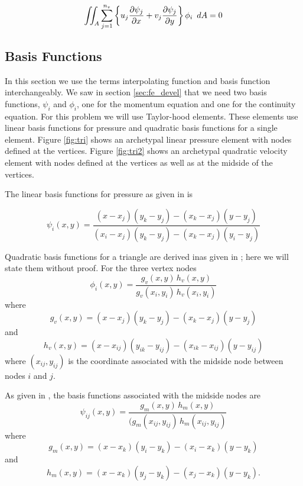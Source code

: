 \documentclass[wrr]{agutex}  %
\newcommand{\p}{\partial}
\begin{document}
\begin{article}
\begin{equation}
\iint_A\sum_{j=1}^{n_v}\left\{u_j\frac{\p \psi_j}{\p x}+v_j{\p \psi_j \over \p y}\right\}\phi_i\,\,\,dA = 0 \label{eqn:full3333}
\end{equation}

\subsection{Basis Functions}

In this section we use the terms interpolating function and basis function interchangeably. We saw in section \ref{sec:fe_devel} that we need two basis functions, $\psi_i$ and $\phi_i$, one for the momentum equation and one for the continuity equation.  For this problem we will use Taylor-hood elements.  These elements use linear basis functions for pressure and quadratic basis functions for a single element. Figure \ref{fig:tri} shows an archetypal linear pressure element with nodes defined at the vertices. Figure \ref{fig:tri2} shows an archetypal quadratic velocity element with nodes defined at the vertices as well as at the midside of the vertices.

The linear basis functions for pressure as given in \cite{Lapidus1982} is 

\begin{equation}
  \psi_i(x,y) = \frac{ ( x   - x_j )  ( y_k - y_j ) - ( x_k - x_j )  ( y   - y_j ) }
                     { ( x_i - x_j )  ( y_k - y_j ) - ( x_k - x_j )  ( y_i - y_j ) }
\end{equation}

Quadratic basis functions for a triangle are derived inas given in \cite{Burkardt2005b}; here we will state them without proof. For the three vertex nodes
\begin{equation}
  \phi_i(x,y) = \frac{ g_v(x,y) \, h_v(x,y) } {  g_v(x_i,y_i) \, h_v(x_i,y_i)  }
\end{equation}
where 
\begin{equation}
  g_v(x,y) = ( x - x_j ) ( y_k - y_j ) - ( x_k - x_j ) ( y - y_j )
\end{equation}
and
\begin{equation}
  h_v(x,y) = ( x - x_{ij} ) ( y_{ik} - y_{ij} ) - ( x_{ik} - x_{ij} ) ( y - y_{ij} )
\end{equation}
where $(x_{ij},y_{ij})$ is the coordinate associated with the midside node between nodes $i$ and $j$.

As given in \cite{Burkardt2005b}, the basis functions associated with the midside nodes are
\begin{equation}
  \psi_{ij}(x,y) = \frac{ g_m(x,y) \, h_m(x,y) }{ ( g_m(x_{ij} ,y_{ij} ) \, h_m(x_{ij} ,y_{ij} ) }
\end{equation}
where
\begin{equation}
  g_m(x,y) = ( x - x_k ) ( y_i - y_k ) - ( x_i - x_k ) ( y - y_k )
\end{equation}
and
\begin{equation}
  h_m(x,y) = ( x - x_k ) ( y_j - y_k ) - ( x_j - x_k ) ( y - y_k ).
\end{equation}


\end{article}
\end{document}
